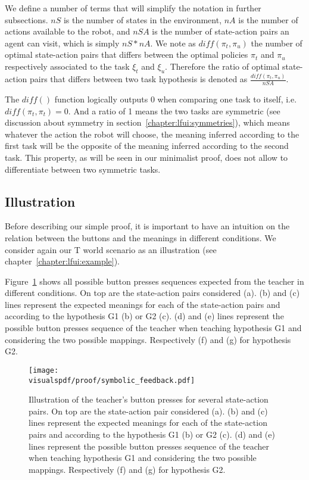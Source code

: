 We define a number of terms that will simplify the notation in further subsections. $nS$ is the number of states in the environment, $nA$ is the number of actions available to the robot, and $nSA$ is the number of state-action pairs an agent can visit, which is simply $nS * nA$. We note as $diff(\pi_t, \pi_u)$ the number of optimal state-action pairs that differs between the optimal policies $\pi_t$ and $\pi_u$ respectively associated to the task $\xi_t$ and $\xi_u$. Therefore the ratio of optimal state-action pairs that differs between two task hypothesis is denoted as $\frac{diff(\pi_t, \pi_u)}{nSA}$. 

The $diff()$ function logically outputs $0$ when comparing one task to itself, i.e. $diff(\pi_t, \pi_t) = 0$. And a ratio of 1 means the two tasks are symmetric (see discussion about symmetry in section~\ref{chapter:lfui:symmetries}), which means whatever the action the robot will choose, the meaning inferred according to the first task will be the opposite of the meaning inferred according to the second task. This property, as will be seen in our minimalist proof, does not allow to differentiate between two symmetric tasks.

\subsection{Illustration}

Before describing our simple proof, it is important to have an intuition on the relation between the buttons and the meanings in different conditions. We consider again our T world scenario as an illustration (see chapter~\ref{chapter:lfui:example}).

Figure~\ref{fig:proofsymbolic} shows all possible button presses sequences expected from the teacher in different conditions. On top are the state-action pairs considered (a). (b) and (c) lines represent the expected meanings for each of the state-action pairs and according to the hypothesis G1 (b) or G2 (c). (d) and (e) lines represent the possible button presses sequence of the teacher when teaching hypothesis G1 and considering the two possible mappings. Respectively (f) and (g) for hypothesis G2.

\begin{figure}[!htbp]
\centering
\texttt{[image: \\visualspdf/proof/symbolic\_feedback.pdf]}
\caption{Illustration of the teacher's button presses for several state-action pairs. On top are the state-action pair considered (a). (b) and (c) lines represent the expected meanings for each of the state-action pairs and according to the hypothesis G1 (b) or G2 (c). (d) and (e) lines represent the possible button presses sequence of the teacher when teaching hypothesis G1 and considering the two possible mappings. Respectively (f) and (g) for hypothesis G2.}
\label{fig:proofsymbolic}
\end{figure} 

